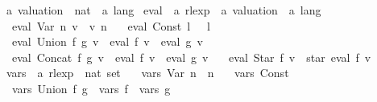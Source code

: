 \begin{isabellebody}
\isanewline
{}\isamarkupfalse%
\ {\isacharprime}{\kern0pt}a\ valuation\ {\isacharequal}{\kern0pt}\ {\isachardoublequoteopen}nat\ {\isasymRightarrow}\ {\isacharprime}{\kern0pt}a\ lang{\isachardoublequoteclose}\isanewline
\isanewline
{}\isamarkupfalse%
\ eval\ {\isacharcolon}{\kern0pt}{\isacharcolon}{\kern0pt}\ {\isachardoublequoteopen}{\isacharprime}{\kern0pt}a\ rlexp\ {\isasymRightarrow}\ {\isacharprime}{\kern0pt}a\ valuation\ {\isasymRightarrow}\ {\isacharprime}{\kern0pt}a\ lang{\isachardoublequoteclose}\ \isanewline
\ \ {\isachardoublequoteopen}eval\ {\isacharparenleft}{\kern0pt}Var\ n{\isacharparenright}{\kern0pt}\ v\ {\isacharequal}{\kern0pt}\ v\ n{\isachardoublequoteclose}\ {\isacharbar}{\kern0pt}\isanewline
\ \ {\isachardoublequoteopen}eval\ {\isacharparenleft}{\kern0pt}Const\ l{\isacharparenright}{\kern0pt}\ {\isacharunderscore}{\kern0pt}\ {\isacharequal}{\kern0pt}\ l{\isachardoublequoteclose}\ {\isacharbar}{\kern0pt}\isanewline
\ \ {\isachardoublequoteopen}eval\ {\isacharparenleft}{\kern0pt}Union\ f\ g{\isacharparenright}{\kern0pt}\ v\ {\isacharequal}{\kern0pt}\ eval\ f\ v\ {\isasymunion}\ eval\ g\ v{\isachardoublequoteclose}\ {\isacharbar}{\kern0pt}\isanewline
\ \ {\isachardoublequoteopen}eval\ {\isacharparenleft}{\kern0pt}Concat\ f\ g{\isacharparenright}{\kern0pt}\ v\ {\isacharequal}{\kern0pt}\ eval\ f\ v\ {\isacharat}{\kern0pt}{\isacharat}{\kern0pt}\ eval\ g\ v{\isachardoublequoteclose}\ {\isacharbar}{\kern0pt}\isanewline
\ \ {\isachardoublequoteopen}eval\ {\isacharparenleft}{\kern0pt}Star\ f{\isacharparenright}{\kern0pt}\ v\ {\isacharequal}{\kern0pt}\ star\ {\isacharparenleft}{\kern0pt}eval\ f\ v{\isacharparenright}{\kern0pt}{\isachardoublequoteclose}\isanewline
\isanewline
{}\isamarkupfalse%
\ vars\ {\isacharcolon}{\kern0pt}{\isacharcolon}{\kern0pt}\ {\isachardoublequoteopen}{\isacharprime}{\kern0pt}a\ rlexp\ {\isasymRightarrow}\ nat\ set{\isachardoublequoteclose}\ \isanewline
\ \ {\isachardoublequoteopen}vars\ {\isacharparenleft}{\kern0pt}Var\ n{\isacharparenright}{\kern0pt}\ {\isacharequal}{\kern0pt}\ {\isacharbraceleft}{\kern0pt}n{\isacharbraceright}{\kern0pt}{\isachardoublequoteclose}\ {\isacharbar}{\kern0pt}\isanewline
\ \ {\isachardoublequoteopen}vars\ {\isacharparenleft}{\kern0pt}Const\ {\isacharunderscore}{\kern0pt}{\isacharparenright}{\kern0pt}\ {\isacharequal}{\kern0pt}\ {\isacharbraceleft}{\kern0pt}{\isacharbraceright}{\kern0pt}{\isachardoublequoteclose}\ {\isacharbar}{\kern0pt}\isanewline
\ \ {\isachardoublequoteopen}vars\ {\isacharparenleft}{\kern0pt}Union\ f\ g{\isacharparenright}{\kern0pt}\ {\isacharequal}{\kern0pt}\ vars\ f\ {\isasymunion}\ vars\ g{\isachardoublequoteclose}\ {\isacharbar}{\kern0pt}\isanewline

\end{isabellebody}
